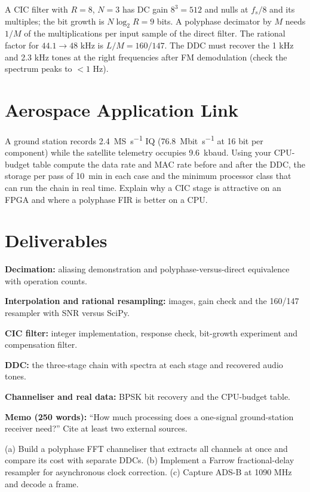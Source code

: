 \documentclass[11pt,a4paper]{article}
\begin{document}
\begin{checkpoint}
A CIC filter with $R=8$, $N=3$ has DC gain $8^3=512$ and nulls at $f_s/8$ and its multiples; the bit growth is $N\log_2R=9$ bits. A polyphase decimator by $M$ needs $1/M$ of the multiplications per input sample of the direct filter. The rational factor for $44.1\to48$ kHz is $L/M=160/147$. The DDC must recover the 1 kHz and 2.3 kHz tones at the right frequencies after FM demodulation (check the spectrum peaks to $<1$ Hz).
\end{checkpoint}

\section*{Aerospace Application Link}
A ground station records \SI{2.4}{\mega S\per\second} IQ (\SI{76.8}{\mega bit\per\second} at 16 bit per component) while the satellite telemetry occupies \SI{9.6}{\kilo baud}. Using your CPU-budget table compute the data rate and MAC rate before and after the DDC, the storage per pass of \SI{10}{\minute} in each case and the minimum processor class that can run the chain in real time. Explain why a CIC stage is attractive on an FPGA and where a polyphase FIR is better on a CPU.

\section*{Deliverables}
\begin{delivs}
  \item[D1] \textbf{Decimation:} aliasing demonstration and polyphase-versus-direct equivalence with operation counts.
  \item[D2] \textbf{Interpolation and rational resampling:} images, gain check and the 160/147 resampler with SNR versus SciPy.
  \item[D3] \textbf{CIC filter:} integer implementation, response check, bit-growth experiment and compensation filter.
  \item[D4] \textbf{DDC:} the three-stage chain with spectra at each stage and recovered audio tones.
  \item[D5] \textbf{Channeliser and real data:} BPSK bit recovery and the CPU-budget table.
  \item[D6] \textbf{Memo (250 words):} ``How much processing does a one-signal ground-station receiver need?'' Cite at least two external sources.
  \item[Bonus] (a) Build a polyphase FFT channeliser that extracts all channels at once and compare its cost with separate DDCs. (b) Implement a Farrow fractional-delay resampler for asynchronous clock correction. (c) Capture ADS-B at 1090 MHz and decode a frame.
\end{delivs}
\end{document}
